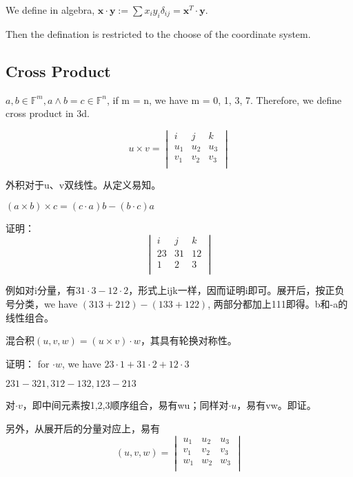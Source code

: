 \documentclass[UTF8]{../../09-Mathematics}
\begin{document}
We define in algebra, $ \boldsymbol{x} \cdot \boldsymbol{y} := \sum{x_iy_i \delta _{ij}} = \boldsymbol{x}^T \cdot \boldsymbol{y}$.

Then the defination is restricted to the choose of the coordinate system. 


\subsection{Cross Product}

$a, b \in \mathbb F^m, a \wedge b = c \in \mathbb F^n $, if m = n, we have m = 0, 1, 3, 7. Therefore, we define cross product in 3d.

\begin{equation}
  u \times  v = 
  \begin{vmatrix}
     i & j & k\\
     u_1 & u_2 & u_3\\
     v_1 & v_2 & v_3\\
  \end{vmatrix}
\end{equation}


\begin{proposition}
  外积对于u、v双线性。从定义易知。
\end{proposition}

\begin{proposition}
  $(a \times b) \times c =  (c \cdot a) b -  (b \cdot c) a   $

  证明：
  \begin{equation}
    \begin{vmatrix}
       i & j & k\\
       23 & 31 & 12\\
       1 & 2 & 3\\
    \end{vmatrix}
  \end{equation}
\end{proposition}
例如对i分量，有$31 \cdot 3-12\cdot2$，形式上ijk一样，因而证明i即可。展开后，按正负号分类，we have $(313+212) - (133+122)$, 两部分都加上111即得。b和-a的线性组合。


\begin{proposition}

  混合积$(u, v, w) = (u \times  v ) \cdot w$，其具有轮换对称性。

  证明：
  for $\cdot w$, we have $23 \cdot 1 + 31 \cdot 2 + 12 \cdot 3$

  $231-321, 312-132, 123-213$

  对$\cdot v$，即中间元素按1,2,3顺序组合，易有wu；同样对$\cdot u$，易有vw。即证。
  

  另外，从展开后的分量对应上，易有
  \begin{equation}
    (u, v, w)  =
    \begin{vmatrix}
      u_1 & u_2 & u_3\\
      v_1 & v_2 & v_3\\
      w_1 & w_2 & w_3\\
    \end{vmatrix}
  \end{equation}

\end{proposition}
\end{document}
